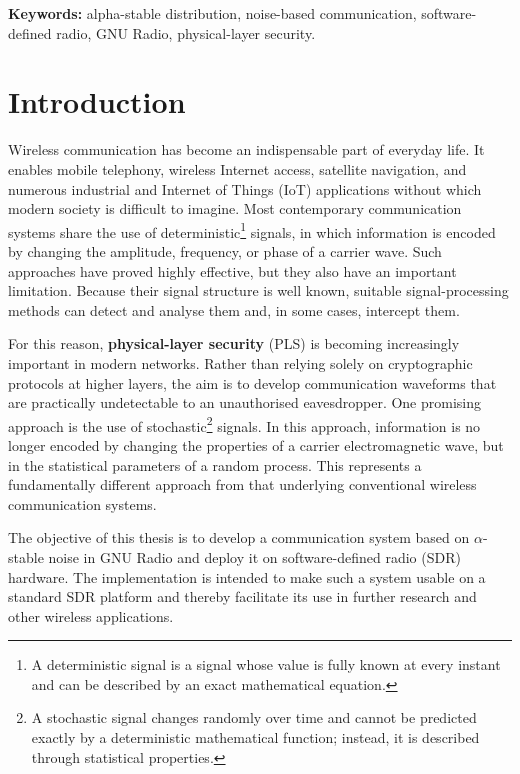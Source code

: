 \documentclass[a4paper, 12pt, openany]{book}
\newcommand{\tkeywords}{alpha-stable distribution, noise-based communication, software-defined radio, GNU Radio, physical-layer security}
\newcommand{\tkeywordsEn}{\tkeywords}
\newcommand{\clearemptydoublepage}{\newpage{\pagestyle{empty}\cleardoublepage}}
\begin{document}
\noindent\textbf{Keywords:} \tkeywordsEn.
\clearemptydoublepage

\mainmatter
\setcounter{page}{1}
\pagestyle{fancy}

\chapter{Introduction}
Wireless communication has become an indispensable part of everyday life. It enables mobile telephony, wireless Internet access, satellite navigation, and numerous industrial and Internet of Things (IoT) applications without which modern society is difficult to imagine. Most contemporary communication systems share the use of deterministic\footnote{A deterministic signal is a signal whose value is fully known at every instant and can be described by an exact mathematical equation.} signals, in which information is encoded by changing the amplitude, frequency, or phase of a carrier wave. Such approaches have proved highly effective, but they also have an important limitation. Because their signal structure is well known, suitable signal-processing methods can detect and analyse them and, in some cases, intercept them.

For this reason, \textbf{physical-layer security}\cite{lutovac2025physical} (PLS) is becoming increasingly important in modern networks. Rather than relying solely on cryptographic protocols at higher layers, the aim is to develop communication waveforms that are practically undetectable to an unauthorised eavesdropper. One promising approach is the use of stochastic\footnote{A stochastic signal changes randomly over time and cannot be predicted exactly by a deterministic mathematical function; instead, it is described through statistical properties.} signals. In this approach, information is no longer encoded by changing the properties of a carrier electromagnetic wave, but in the statistical parameters of a random process. This represents a fundamentally different approach from that underlying conventional wireless communication systems.

The objective of this thesis is to develop a communication system based on $\alpha$-stable noise in GNU Radio and deploy it on software-defined radio (SDR) hardware. The implementation is intended to make such a system usable on a standard SDR platform and thereby facilitate its use in further research and other wireless applications.
\end{document}
